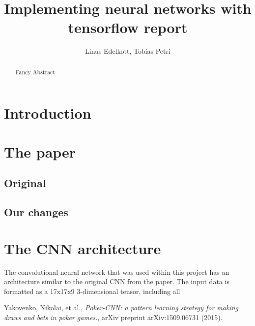 \documentclass[]{report}
\title{Implementing neural networks with tensorflow report}
\author{Linus Edelkott, Tobias Petri}
\begin{document}
\maketitle

\begin{abstract}
	Fancy Abstract
\end{abstract}


\section{Introduction}

\section{The paper}
\subsection{Original}
\subsection{Our changes}
\section{The CNN architecture}

The convolutional neural network that was used within this project has an architecture similar to the original CNN from the paper\cite{1}. The input data is formatted as a 17x17x9 3-dimensional tensor, including all 



\begin{thebibliography}{}
	 Yakovenko, Nikolai, et al., \emph{Poker-CNN: a pattern learning strategy for making draws and bets in poker games.}, arXiv preprint arXiv:1509.06731 (2015).
\end{thebibliography}  
\end{document}
